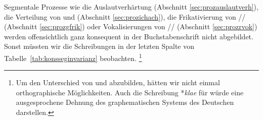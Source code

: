 \begin{table}
  \centering
  \caption{Invarianz zugrundeliegender Konsonanten-Segmente in der deutschen Buchstabenschrift}
  \label{tab:konsseginvarianz}
\end{table}

Segmentale Prozesse wie die Auslautverhärtung (Abschnitt \ref{sec:prozauslautverh}), die Verteilung von \textipa{[\c{c}]} und \textipa{[X]} (Abschnitt \ref{sec:prozichach}), die Frikativierung von // (Abschnitt \ref{sec:prozgfrik}) oder Vokalisierungen von // (Abschnitt \ref{sec:prozrvok}) werden offensichtlich ganz konsequent in der Buchstabenschrift nicht abgebildet.
Sonst müssten wir die Schreibungen in der letzten Spalte von Tabelle~\ref{tab:konsseginvarianz} beobachten.%
\footnote{Um den Unterschied von \textipa{[\c{c}]} und \textipa{[X]} abzubilden, hätten wir nicht einmal orthographische Möglichkeiten.
Auch die Schreibung *\textit{klae} für \textipa{[kl\t{a@}]} würde eine ausgesprochene Dehnung des graphematischen Systems des Deutschen darstellen.}

